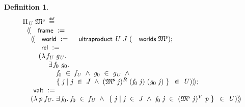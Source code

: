 \documentclass{llncs}
\newtheorem{defn}{Definition}[chapter]
\newenvironment{holmath}{\begin{displaymath}\begin{array}{l}}{\end{array}\end{displaymath}\ignorespacesafterend}
\renewcommand{\HOLConst}[1]{{\textsf{\upshape\small #1}}}
\renewcommand{\HOLFieldName}[1]{\HOLConst{#1}}
\renewcommand{\HOLTokenLeftrec}{\ensuremath{\langle\!\langle}}
\renewcommand{\HOLTokenRightrec}{\ensuremath{\rangle\!\rangle}}
\renewcommand{\HOLTokenBar}{\mbox{$|$}}
\begin{document}
\begin{defn}
{\upshape\cite[Definition 2.70 (Ultraproduct of Modal Models)]{Blackburn}}
\begin{holmath}
  \Pi\sb{\HOLFreeVar{U}}\;\HOLFreeVar{\ensuremath{\mathfrak{M}\sp{\sf s}}}\;\HOLTokenDefEquality{}\\
\;\;\HOLTokenLeftrec{}\HOLFieldName{frame}\;:=\\
\;\;\;\;\HOLTokenLeftrec{}\HOLFieldName{world}\;:=\;\HOLConst{ultraproduct}\;\HOLFreeVar{U}\;\HOLFreeVar{J}\;(\HOLConst{worlds}\;\HOLFreeVar{\ensuremath{\mathfrak{M}\sp{\sf s}}});\\
\;\;\;\;\;\;\HOLFieldName{rel}\;:=\\
\;\;\;\;\;\;\;\;(\HOLTokenLambda{}\HOLBoundVar{\ensuremath{f\sb{U}}}\;\HOLBoundVar{\ensuremath{g\sb{U}}}.\\
\;\;\;\;\;\;\;\;\;\;\;\;\;\HOLSymConst{\HOLTokenExists{}}\HOLBoundVar{f}\sb{\mathrm{0}}\;\HOLBoundVar{g}\sb{\mathrm{0}}.\\
\;\;\;\;\;\;\;\;\;\;\;\;\;\;\;\;\;\HOLBoundVar{f}\sb{\mathrm{0}}\;\HOLSymConst{\HOLTokenIn{}}\;\HOLBoundVar{\ensuremath{f\sb{U}}}\;\HOLSymConst{\HOLTokenConj{}}\;\HOLBoundVar{g}\sb{\mathrm{0}}\;\HOLSymConst{\HOLTokenIn{}}\;\HOLBoundVar{\ensuremath{g\sb{U}}}\;\HOLSymConst{\HOLTokenConj{}}\\
\;\;\;\;\;\;\;\;\;\;\;\;\;\;\;\;\;\HOLTokenLeftbrace{}\HOLBoundVar{j}\;\HOLTokenBar{}\;\HOLBoundVar{j}\;\HOLSymConst{\HOLTokenIn{}}\;\HOLFreeVar{J}\;\HOLSymConst{\HOLTokenConj{}}\;(\HOLFreeVar{\ensuremath{\mathfrak{M}\sp{\sf s}}}\;\HOLBoundVar{j})\HOLSymConst{\ensuremath{\sp{R}}}\;(\HOLBoundVar{f}\sb{\mathrm{0}}\;\HOLBoundVar{j})\;(\HOLBoundVar{g}\sb{\mathrm{0}}\;\HOLBoundVar{j})\HOLTokenRightbrace{}\;\HOLSymConst{\HOLTokenIn{}}\;\HOLFreeVar{U})\HOLTokenRightrec{};\\
\;\;\HOLFieldName{valt}\;:=\\
\;\;\;\;(\HOLTokenLambda{}\HOLBoundVar{p}\;\HOLBoundVar{\ensuremath{f\sb{U}}}.\;\HOLSymConst{\HOLTokenExists{}}\HOLBoundVar{f}\sb{\mathrm{0}}.\;\HOLBoundVar{f}\sb{\mathrm{0}}\;\HOLSymConst{\HOLTokenIn{}}\;\HOLBoundVar{\ensuremath{f\sb{U}}}\;\HOLSymConst{\HOLTokenConj{}}\;\HOLTokenLeftbrace{}\HOLBoundVar{j}\;\HOLTokenBar{}\;\HOLBoundVar{j}\;\HOLSymConst{\HOLTokenIn{}}\;\HOLFreeVar{J}\;\HOLSymConst{\HOLTokenConj{}}\;\HOLBoundVar{f}\sb{\mathrm{0}}\;\HOLBoundVar{j}\;\HOLSymConst{\HOLTokenIn{}}\;(\HOLFreeVar{\ensuremath{\mathfrak{M}\sp{\sf s}}}\;\HOLBoundVar{j})\HOLSymConst{\ensuremath{\sp{V}}}\;\HOLBoundVar{p}\HOLTokenRightbrace{}\;\HOLSymConst{\HOLTokenIn{}}\;\HOLFreeVar{U})\HOLTokenRightrec{}
\end{holmath}
\end{defn}
\end{document}
